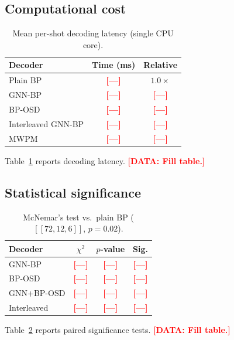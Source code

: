 \documentclass[a4paper,twocolumn,11pt,unpublished,nopdfoutputerror]{quantumarticle}
\newcommand{\code}[3]{\ensuremath{[\![#1,#2,#3]\!]}}
\newcommand{\pending}[1]{\textcolor{red}{\textbf{[#1]}}}
\begin{document}
\subsection{Computational cost}

\begin{table}[t]
\centering
\caption{Mean per-shot decoding latency (single CPU core).}
\label{tab:timing}
\begin{tabular}{@{}lcc@{}}
\toprule
Decoder & Time (ms) & Relative \\
\midrule
Plain BP & \pending{---} & $1.0\times$ \\
GNN-BP & \pending{---} & \pending{---} \\
BP-OSD & \pending{---} & \pending{---} \\
Interleaved GNN-BP & \pending{---} & \pending{---} \\
MWPM & \pending{---} & \pending{---} \\
\bottomrule
\end{tabular}
\end{table}

Table~\ref{tab:timing} reports decoding latency. \pending{DATA: Fill table.}

\subsection{Statistical significance}

\begin{table}[t]
\centering
\caption{McNemar's test vs.\ plain BP ($\code{72}{12}{6}$, $p=0.02$).}
\label{tab:mcnemar}
\begin{tabular}{@{}lccc@{}}
\toprule
Decoder & $\chi^2$ & $p$-value & Sig. \\
\midrule
GNN-BP & \pending{---} & \pending{---} & \pending{---} \\
BP-OSD & \pending{---} & \pending{---} & \pending{---} \\
GNN+BP-OSD & \pending{---} & \pending{---} & \pending{---} \\
Interleaved & \pending{---} & \pending{---} & \pending{---} \\
\bottomrule
\end{tabular}
\end{table}

Table~\ref{tab:mcnemar} reports paired significance tests. \pending{DATA: Fill table.}


\end{document}
